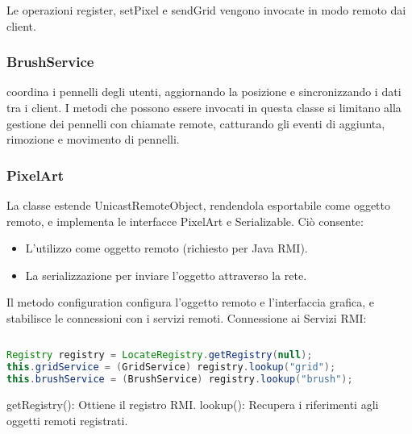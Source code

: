 Le operazioni register, setPixel e sendGrid vengono invocate in modo remoto dai client.

\subsubsection{BrushService}

coordina i pennelli degli utenti, aggiornando la posizione e sincronizzando i dati tra i client. I metodi che possono essere invocati in questa classe si limitano alla gestione dei pennelli con chiamate remote, catturando gli eventi di
aggiunta, rimozione e movimento di pennelli.

\subsubsection{PixelArt}

La classe estende UnicastRemoteObject, rendendola esportabile come oggetto remoto, e implementa le interfacce PixelArt e Serializable. Ciò consente:

\begin{itemize}
    \item L'utilizzo come oggetto remoto (richiesto per Java RMI).
    \item La serializzazione per inviare l'oggetto attraverso la rete.
\end{itemize}

Il metodo  configuration configura l'oggetto remoto e l'interfaccia grafica, e stabilisce le connessioni con i servizi remoti.
Connessione ai Servizi RMI:

\begin{lstlisting}[language=Java, caption={
    getRegistry ottiene il registro RMI. lookup recupera i riferimenti agli oggetti remoti registrati.
}, label=list:java_code_pxArt]
   
Registry registry = LocateRegistry.getRegistry(null);
this.gridService = (GridService) registry.lookup("grid");
this.brushService = (BrushService) registry.lookup("brush");
\end{lstlisting}

getRegistry(): Ottiene il registro RMI.
lookup(): Recupera i riferimenti agli oggetti remoti registrati.